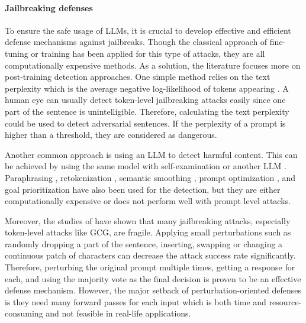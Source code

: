 \paragraph{Jailbreaking defenses %
}
\label{subsec:jailbreaking_defenses}
To ensure the safe usage of LLMs, it is crucial to develop effective and efficient defense mechanisms against jailbreaks. Though the classical approach of fine-tuning or training  \citep{oneill2023adversarial} has been applied for this type of attacks, they are all computationally expensive methods. As a solution, the literature focuses more on post-training detection approaches. One simple method relies on the text perplexity which is the average negative log-likelihood of tokens appearing \citep{jain2023baseline, alon2023detecting}. A human eye can usually detect token-level jailbreaking attacks easily since one part of the sentence is unintelligible. Therefore, calculating the text perplexity could be used to detect adversarial sentences. If the perplexity of a prompt is higher than a threshold, they are considered as dangerous. 

Another common approach is using an LLM to detect harmful content. This can be achieved by using the same model with self-examination \citep{phute2023llm, li2024rain, xie2023defending, kim2024break} or another LLM \citep{perez2022red, wang2024defending, zeng2024autodefense,pisano2024bergeron}. Paraphrasing \citep{yung2024round}, retokenization \citep{jain2023baseline}, semantic smoothing \citep{ji2024defending}, prompt optimization \citep{zhou2024robust}, and goal prioritization \citep{zhang2023defending} have also been used for the detection, but they are either computationally expensive or does not perform well with prompt level attacks. 

Moreover, the studies of \citet{robey2023smoothllm, cao2023defending, kumar2023certifying} have shown that many jailbreaking attacks, especially token-level attacks like GCG, are fragile. Applying small perturbations such as randomly dropping a part of the sentence, inserting, swapping or changing a continuous patch of characters can decrease the attack success rate significantly. Therefore, perturbing the original prompt multiple times, getting a response for each, and using the majority vote as the final decision is proven to be an effective defense mechanism. However, the major setback of perturbation-oriented defenses is they need many forward passes for each input which is both time and resource-consuming and not feasible in real-life applications. 





